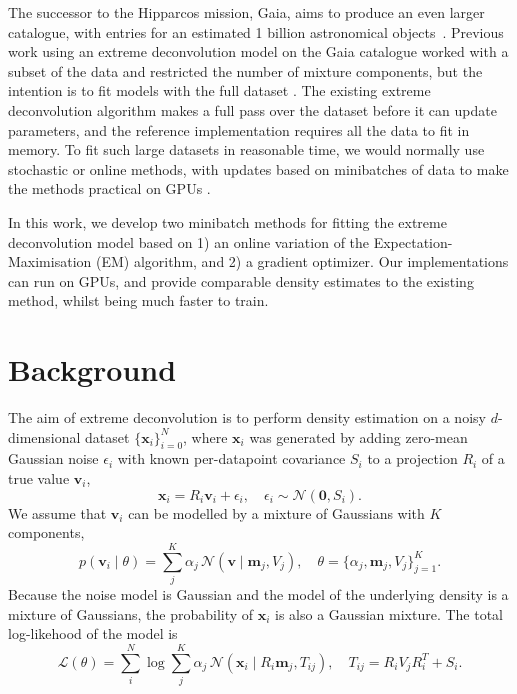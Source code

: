 \documentclass{article}
\newcommand{\bx}{\mathbf{x}}
\newcommand{\bv}{\mathbf{v}}
\newcommand{\bm}{\mathbf{m}}
\begin{document}
The successor to the Hipparcos mission, Gaia, aims to produce an even larger catalogue, with entries for an estimated 1 billion astronomical objects~\cite{collaborationGaiaMission2016}.
Previous work using an extreme deconvolution model on the Gaia catalogue %
worked with a subset of the data and restricted the number of mixture components,
but the intention is to fit models with the full dataset
\cite{andersonImprovingGaiaParallax2018}.
The existing extreme deconvolution algorithm makes a full pass over the dataset before it can update parameters, and the reference implementation requires all the data to fit in memory. To fit such large datasets in reasonable time, we would normally use stochastic or online methods, with updates based on minibatches of data to make the methods practical on GPUs \cite{bottou2018}.

In this work, we develop two minibatch methods for fitting the extreme deconvolution model
based on 1) an online variation of the Expectation-Maximisation (EM) algorithm, and 2) a gradient optimizer.
Our implementations can run on GPUs, and provide comparable density estimates to the existing method, whilst being much faster to train.

\section{Background}

The aim of extreme deconvolution is to perform density estimation on a noisy $d$-dimensional dataset $\{\bx_i\}_{i=0}^N$, where $\bx_i$ was generated by adding zero-mean Gaussian noise $\epsilon_i$ with known per-datapoint covariance $S_i$ to a projection $R_i$ of a true value $\bv_i$,
\begin{equation}
  \bx_i = R_i\bv_i + \epsilon_i,\quad  \epsilon_i \sim \mathcal{N}(\mathbf{0}, S_i).
\end{equation}
We assume that $\bv_i$ can be modelled by a mixture of Gaussians with $K$ components,
\begin{equation}
p(\bv_i \mid \theta) = \sum_j^K \alpha_j \,\mathcal{N}(\bv \mid \bm_j, V_j), \quad \theta = \{\alpha_j, \bm_j, V_j\}_{j=1} ^ K.
\end{equation}
Because the noise model is Gaussian and the model of the underlying density is a mixture of Gaussians, the probability of $\bx_i$ is also a Gaussian mixture.
The total log-likehood of the model is
\begin{equation}
\mathcal{L}(\theta) = \sum_i^N \log \sum_j^K \alpha_j\,\mathcal{N}(\bx_i \mid R_i\bm_j, T_{ij}), \quad T_{ij} = R_iV_jR_i^T + S_i.
\end{equation}
\end{document}
